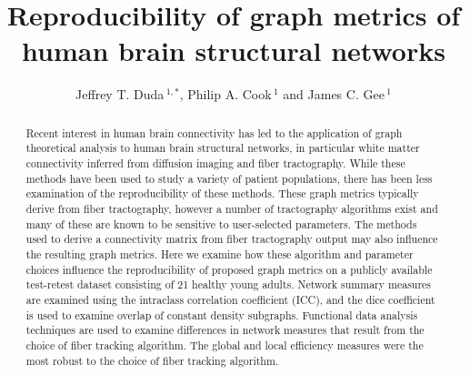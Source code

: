 \documentclass{frontiersSCNS} %
\def\journal{Neurosciences}
\def\firstAuthorLast{Duda {et~al}} %
\def\Authors{Jeffrey T. Duda\,$^{1,*}$, Philip A. Cook\,$^{1}$ and James C. Gee\,$^1$}
\begin{document}
\onecolumn
{}

\title[Reproducibility of structural graph metrics]{Reproducibility of graph metrics of human brain structural networks}
\author[\firstAuthorLast ]{\Authors}
\address{}
\correspondance{}
\editor{}

\maketitle
\begin{abstract}

Recent interest in human brain connectivity has led to the application of
graph theoretical analysis to human brain structural networks, in
particular white matter connectivity inferred from diffusion imaging
and fiber tractography. While these methods have been used to study a
variety of patient populations, there has been less examination of the
reproducibility of these methods. These graph metrics typically derive
from fiber tractography, however a number of tractography algorithms
exist and many of these are known to be sensitive to user-selected
parameters. The methods used to derive a connectivity matrix from
fiber tractography output may also influence the resulting graph
metrics. Here we examine how these algorithm and parameter choices
influence the reproducibility of proposed graph metrics on a publicly
available test-retest dataset consisting of 21 healthy young
adults. Network summary
measures are examined using the intraclass correlation coefficient
(ICC), and the dice coefficient is used to examine overlap 
of constant density subgraphs. Functional data analysis techniques are used
to examine differences in network measures that result from the choice
of fiber tracking algorithm. The global and local efficiency measures were 
the most robust to the choice of fiber tracking algorithm.


\end{abstract}
\end{document}
